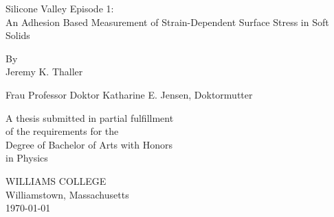 \documentclass[12pt, oneside]{book}
\begin{document}
\begin{titlepage}
\begin{center}

\vspace*{2cm}

{\huge Silicone Valley Episode 1:\\An Adhesion Based Measurement of Strain-Dependent Surface Stress in Soft Solids} %

\vspace{2cm}

{\large By\\\vspace{.5em}Jeremy K. Thaller}

\vspace{2cm}
{Frau Professor Doktor Katharine E. Jensen, Doktormutter}


\vfill

A thesis submitted in partial fulfillment\\
of the requirements for the\\
Degree of Bachelor of Arts with Honors\\
in Physics

\vspace*{3cm}

WILLIAMS COLLEGE\\
Williamstown, Massachusetts\\
\today %
\end{center}
\end{titlepage}

\frontmatter 
\end{document}

